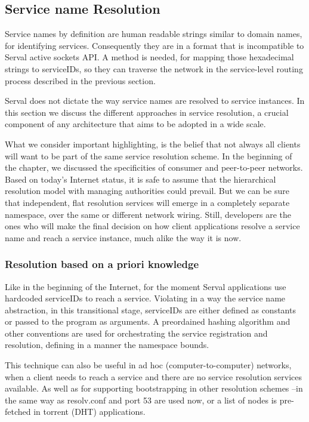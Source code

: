 \newpage
\subsection{Service name Resolution}
Service names by definition are human readable strings similar to domain names, for identifying services.
Consequently they are in a format that is incompatible to Serval active sockets API.
A method is needed, for mapping those hexadecimal strings to serviceIDs, so they can traverse the network in the service-level routing process described in the previous section.

Serval does not dictate the way service names are resolved to service instances.
In this section we discuss the different approaches in service resolution, a crucial component of any architecture that aims to be adopted in a wide scale.

What we consider important highlighting, is the belief that not always all clients will want to be part of the same service resolution scheme.
In the beginning of the chapter, we discussed the specificities of consumer and peer-to-peer networks.
Based on today's Internet status, it is safe to assume that the hierarchical resolution model with managing authorities could prevail.
But we can be sure that independent, flat resolution services will emerge in a completely separate namespace, over the same or different network wiring.
Still, developers are the ones who will make the final decision on how client applications resolve a service name and reach a service instance, much alike the way it is now.



\subsubsection{Resolution based on a priori knowledge}
Like in the beginning of the Internet, for the moment Serval applications use hardcoded serviceIDs to reach a service.
Violating in a way the service name abstraction, in this transitional stage, serviceIDs are either defined as constants or passed to the program as arguments.
A preordained hashing algorithm and other conventions are used for orchestrating the service registration and resolution, defining in a manner the namespace bounds.

This technique can also be useful in ad hoc (computer-to-computer) networks, when a client needs to reach a service and there are no service resolution services available.
As well as for supporting bootstrapping in other resolution schemes --in the same way as resolv.conf and port 53 are used now, or a list of nodes is pre-fetched in torrent (DHT) applications.



